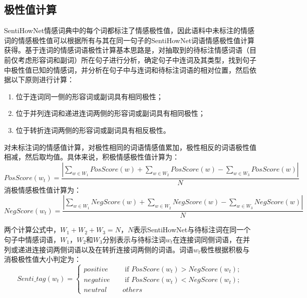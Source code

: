 \subsection{极性值计算}
SentiHowNet情感词典中的每个词都标注了情感极性值，因此语料中未标注的情感词的情感极性值可以根据所有与其在同一句子的SentiHowNet词语情感极性值计算获得。基于连词的情感词语极性计算基本思路是，对抽取到的待标注情感词语（目前仅考虑形容词和副词）所在句子进行分析，确定句子中连词及其类型，找到句子中极性值已知的情感词，并分析在句子中与连词和待标注词语的相对位置，然后依据以下原则进行计算：
\begin{enumerate}
\item 位于连词同一侧的形容词或副词具有相同极性；
\item 位于并列连词和递进连词两侧的形容词或副词具有相同极性；
\item 位于转折连词两侧的形容词或副词具有相反极性。
\end{enumerate}
对未标注词的情感值计算，对极性相同的词语情感值累加，极性相反的词语极性值相减，然后取均值。具体来说，积极情感极性值计算为：
\begin{equation}
PosScore(w_t)=\dfrac{|\sum_{w \in W_1}PosScore(w)+\sum_{w \in W_2}PosScore(w)-\sum_{w \in W_3}PosScore(w)|}{N}
\end{equation}
消极情感极性值计算为：
\begin{equation}
NegScore(w_t)=\dfrac{|\sum_{w \in W_1}NegScore(w)+\sum_{w \in W_2}NegScore(w)-\sum_{w \in W_3}NegScore(w)|}{N}
\end{equation}

两个计算公式中，$W_1+W_2+W_3=N$，$N$表示SentiHowNet与待标注词在同一个句子中情感词语，$W_1$，$W_2$和$W_3$分别表示与待标注词$w_t$在连接词同侧词语，在并列或递进连接词两侧词语以及在转折连接词两侧的词语。词语$w_t$极性根据积极与消极极性值大小判定为：
\begin{equation}
\label{eq3-2}
Senti\_tag(w_t)=
\begin{cases}
 positive \quad & \text{ if } PosScore(w_t)> NegScore(w_t); \\ 
 negative \quad &\text{ if } PosScore(w_t)< NegScore(w_t);  \\ 
 neutral  \quad & others
\end{cases}
\end{equation}

